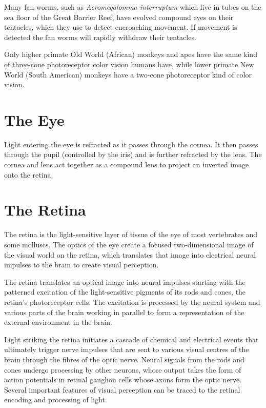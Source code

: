 Many fan worms, such as \emph{Acromegalomma interruptum} which live in tubes on the sea floor of the Great Barrier Reef, have evolved compound eyes on their tentacles, which they use to detect encroaching movement. If movement is detected the fan worms will rapidly withdraw their tentacles.

Only higher primate Old World (African) monkeys and apes have the same kind of three-cone photoreceptor color vision humans have, while lower primate New World (South American) monkeys have a two-cone photoreceptor kind of color vision.

\hypertarget{the-eye}{%
\section{The Eye}\label{the-eye}}

Light entering the eye is refracted as it passes through the cornea. It then passes through the pupil (controlled by the iris) and is further refracted by the lens. The cornea and lens act together as a compound lens to project an inverted image onto the retina.

\hypertarget{the-retina}{%
\section{The Retina}\label{the-retina}}

The retina is the light-sensitive layer of tissue of the eye of most vertebrates and some molluscs. The optics of the eye create a focused two-dimensional image of the visual world on the retina, which translates that image into electrical neural impulses to the brain to create visual perception.

The retina translates an optical image into neural impulses starting with the patterned excitation of the light-sensitive pigments of its rods and cones, the retina's photoreceptor cells. The excitation is processed by the neural system and various parts of the brain working in parallel to form a representation of the external environment in the brain.

Light striking the retina initiates a cascade of chemical and electrical events that ultimately trigger nerve impulses that are sent to various visual centres of the brain through the fibres of the optic nerve. Neural signals from the rods and cones undergo processing by other neurons, whose output takes the form of action potentials in retinal ganglion cells whose axons form the optic nerve. Several important features of visual perception can be traced to the retinal encoding and processing of light.

